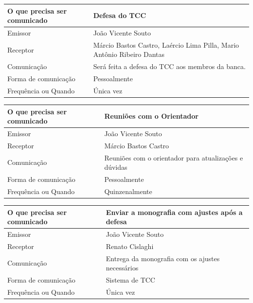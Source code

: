 \documentclass[
	12pt,				%
	openright,			%
	twoside,			%
	a4paper,			%
	english,			%
	brazil,				%
	]{abntex2}
\begin{document}
\begin{center}
\begin{tabular}{|l|p{9cm}|}
\hline
    O que precisa ser comunicado & Defesa do TCC \\ \hline
    Emissor & João Vicente Souto \\ \hline
    Receptor & Márcio Bastos Castro, Laércio Lima Pilla, Mario Antônio Ribeiro Dantas\\ \hline
    Comunicação & Será feita a defesa do TCC aos membros da banca.  \\ \hline
    Forma de comunicação & Pessoalmente \\ \hline
    Frequência ou Quando & Única vez \\ \hline
\end{tabular}
\end{center}

\begin{center}
\begin{tabular}{|l|p{9cm}|}
\hline
    O que precisa ser comunicado & Reuniões com o Orientador \\ \hline
    Emissor & João Vicente Souto \\ \hline
    Receptor & Márcio Bastos Castro \\ \hline
    Comunicação & Reuniões com o orientador para atualizações e dúvidas \\ \hline
    Forma de comunicação & Pessoalmente \\ \hline
    Frequência ou Quando & Quinzenalmente \\ \hline
\end{tabular}
\end{center}

\begin{center}
\begin{tabular}{|l|p{9cm}|}
\hline
    O que precisa ser comunicado & Enviar a monografia com ajustes após a defesa \\ \hline
    Emissor & João Vicente Souto \\ \hline
    Receptor & Renato Cislaghi \\ \hline
    Comunicação & Entrega da monografia com os ajustes necessários \\ \hline
    Forma de comunicação & Sistema de TCC \\ \hline
    Frequência ou Quando & Única vez \\ \hline
\end{tabular}
\end{center}
\end{document}
